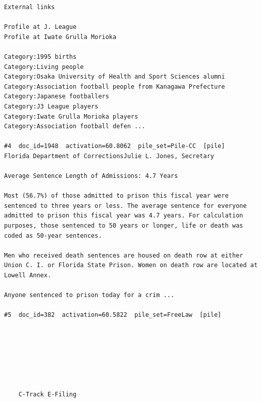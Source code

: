 \begin{verbatim}
External links

Profile at J. League
Profile at Iwate Grulla Morioka

Category:1995 births
Category:Living people
Category:Osaka University of Health and Sport Sciences alumni
Category:Association football people from Kanagawa Prefecture
Category:Japanese footballers
Category:J3 League players
Category:Iwate Grulla Morioka players
Category:Association football defen ...

#4  doc_id=1948  activation=60.8062  pile_set=Pile-CC  [pile]
Florida Department of CorrectionsJulie L. Jones, Secretary

Average Sentence Length of Admissions: 4.7 Years

Most (56.7%) of those admitted to prison this fiscal year were sentenced to three years or less. The average sentence for everyone admitted to prison this fiscal year was 4.7 years. For calculation purposes, those sentenced to 50 years or longer, life or death was coded as 50-year sentences.

Men who received death sentences are housed on death row at either Union C. I. or Florida State Prison. Women on death row are located at Lowell Annex.

Anyone sentenced to prison today for a crim ...

#5  doc_id=382  activation=60.5822  pile_set=FreeLaw  [pile]



    



	C-Track E-Filing
	
	
	
		

	
	
	
	

	
		
	
	
	
     

	
	
	
	
	
	
	
	
	
	
	
	
	
	
	
	
	
	
	
	

	
	 
	








\end{verbatim}
